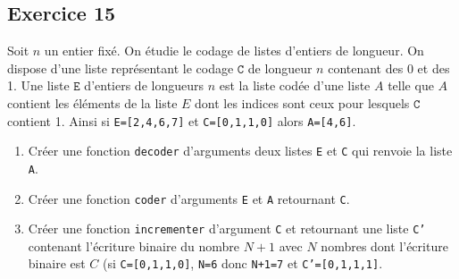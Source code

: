\documentclass[10pt,fleqn]{article} %
\begin{document}
\begin{multicols}{2}
\subsection*{Exercice 15}
Soit $n$ un entier fixé. On étudie le codage de listes d'entiers de longueur.  On dispose d'une liste représentant le codage $\texttt{C}$ de longueur $n$ contenant des 0 et des 1.  Une liste $\texttt{E}$ d'entiers de longueurs $n$ est la liste codée d'une liste $A$ telle que $A$ contient les éléments de la liste $E$ dont les indices sont ceux pour lesquels $\texttt{C}$ contient 1. 
Ainsi si \texttt{E=[2,4,6,7]} et \texttt{C=[0,1,1,0]} alors \texttt{A=[4,6]}.
\begin{enumerate}
\item Créer une fonction \texttt{decoder} d'arguments deux listes \texttt{E} et \texttt{C} qui renvoie la liste \texttt{A}.
\item Créer une fonction \texttt{coder} d'arguments \texttt{E} et \texttt{A} retournant \texttt{C}.
\item Créer une fonction \texttt{incrementer} d'argument \texttt{C} et retournant une liste \texttt{C'} contenant l'écriture binaire du nombre $N+1$ avec $N$ nombres dont l'écriture binaire est $C$ (si \texttt{C=[0,1,1,0]}, \texttt{N=6} donc \texttt{N+1=7} et \texttt{C'=[0,1,1,1]}.
\end{enumerate}


%
%


\end{multicols}
\end{document}
